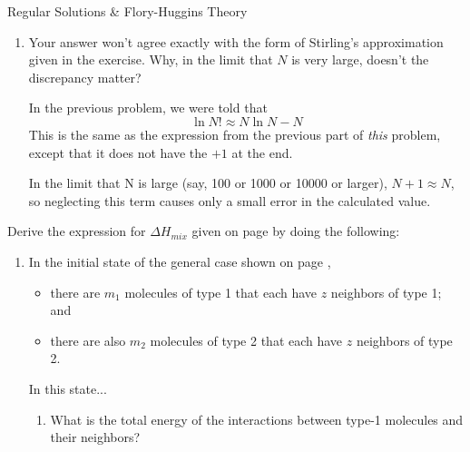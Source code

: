 \begin{activity}{Regular Solutions \& Flory-Huggins Theory}
\begin{exercises}
\begin{enumerate}
				\item Your answer won't agree exactly with the form of Stirling's approximation given in the exercise.  Why, in the limit that $N$ is very large, doesn't the discrepancy matter?
				
					\begin{solution}{}
						In the previous problem, we were told that
						\begin{equation*}
							\ln N! \approx N \ln N - N
						\end{equation*}
						This is the same as the expression from the previous part of \emph{this} problem, except that it does not have the $+1$ at the end.
						
						In the limit that N is large (say, 100 or 1000 or 10000 or larger), $N+1 \approx N$, so neglecting this term causes only a small error in the calculated value.
					\end{solution}
					
			\end{enumerate}
			
	\exercise Derive the expression for $\Delta H_{mix}$ given on page \pageref{\labelbase:eqn:Hmix} by doing the following: \label{\labelbase:exc:mixingenthalpy}
		
		\begin{enumerate}
		
		\item In the initial state of the general case shown on page \pageref{\labelbase:eqn:idealS}, 
		\begin{itemize}[itemsep=0pt,topsep=3pt]
			\item there are $m_1$ molecules of type 1 that each have $z$ neighbors of type 1; and
			\item there are also $m_2$ molecules of type 2 that each have $z$ neighbors of type 2.
		\end{itemize}
		In this state...
			
				\begin{enumerate} 
				
					\item What is the total energy of the interactions between type-1 molecules and their neighbors?
					
						\begin{solution}\end{solution}
				

\end{enumerate}
\end{enumerate}
\end{exercises}
\end{activity}
